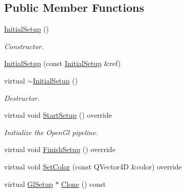 \subsection*{Public Member Functions}
\begin{DoxyCompactItemize}
\item 
\mbox{\label{class_geometry_engine_1_1_geometry_gl_setup_1_1_initial_setup_a30668779828976e667e8899d519a5fae}} 
\mbox{\hyperlink{class_geometry_engine_1_1_geometry_gl_setup_1_1_initial_setup_a30668779828976e667e8899d519a5fae}{Initial\+Setup}} ()
\begin{DoxyCompactList}\small\item\em Constructor. \end{DoxyCompactList}\item 
\mbox{\hyperlink{class_geometry_engine_1_1_geometry_gl_setup_1_1_initial_setup_ad6ddb23c7317917d38d9f2510394ee11}{Initial\+Setup}} (const \mbox{\hyperlink{class_geometry_engine_1_1_geometry_gl_setup_1_1_initial_setup}{Initial\+Setup}} \&ref)
\item 
\mbox{\label{class_geometry_engine_1_1_geometry_gl_setup_1_1_initial_setup_a2a617bbc27b701bfb720b69b9e27a531}} 
virtual \mbox{\hyperlink{class_geometry_engine_1_1_geometry_gl_setup_1_1_initial_setup_a2a617bbc27b701bfb720b69b9e27a531}{$\sim$\+Initial\+Setup}} ()
\begin{DoxyCompactList}\small\item\em Destructor. \end{DoxyCompactList}\item 
\mbox{\label{class_geometry_engine_1_1_geometry_gl_setup_1_1_initial_setup_a304b9d9172d688a340175dfabb10e8e7}} 
virtual void \mbox{\hyperlink{class_geometry_engine_1_1_geometry_gl_setup_1_1_initial_setup_a304b9d9172d688a340175dfabb10e8e7}{Start\+Setup}} () override
\begin{DoxyCompactList}\small\item\em Initialize the Open\+Gl pipeline. \end{DoxyCompactList}\item 
virtual void \mbox{\hyperlink{class_geometry_engine_1_1_geometry_gl_setup_1_1_initial_setup_a4ba4e34bcc09a800ab98dbe3181f1263}{Finish\+Setup}} () override
\item 
virtual void \mbox{\hyperlink{class_geometry_engine_1_1_geometry_gl_setup_1_1_initial_setup_a403192af4493ada23671bf1d95f2da89}{Set\+Color}} (const Q\+Vector4D \&color) override
\item 
virtual \mbox{\hyperlink{class_geometry_engine_1_1_geometry_gl_setup_1_1_gl_setup}{Gl\+Setup}} $\ast$ \mbox{\hyperlink{class_geometry_engine_1_1_geometry_gl_setup_1_1_initial_setup_ade45cd909edd6ff3cae7323d5e1c53d0}{Clone}} () const
\end{DoxyCompactItemize}
